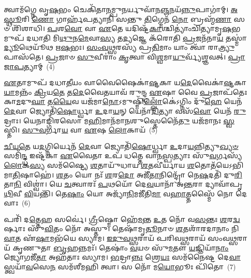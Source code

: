 {\anuvakamend[{\-\ul{𑌏}\-𑌨\-\ul{𑌮𑍇}\-𑌤𑌦\-\ul{𑌹𑍍𑌨𑍋}\-\-𑌽𑌷𑍍𑌟𑌾𑌚᳴𑌤𑍍𑌵𑌾𑌰𑌿𑍞𑌶𑌚𑍍𑌚}]}%

𑌤𑍍𑌵𑌾𑌮᳴𑌗𑍍𑌨𑍇 𑌵𑍃\-\ul{𑌷}\-𑌭𑌂 𑌚𑍇𑌕𑌿᳴𑌤𑌾\-\ul{𑌨}\-𑌮𑍍𑌪𑍁\-\ul{𑌨}\-𑌰𑍍𑌯𑍁𑌵𑌾᳴𑌨\-\ul{𑌞𑍍𑌜}\-𑌨𑌯᳴\-\ul{𑌨𑍍𑌨𑍁}\-𑌪𑌾𑌗𑌾॑𑌮𑍍। \ul{𑌅}\-\-\ul{𑌸𑍍𑌥𑍂}\-𑌰𑌿 \ul{𑌣𑍋} 𑌗𑌾𑌰𑍍\mbox{}𑌹᳴𑌪𑌤𑍍𑌯𑌾𑌨𑌿 𑌸𑌨𑍍𑌤𑍁 \ul{𑌤𑌿}\-𑌗𑍍𑌮𑍇𑌨᳴ \ul{𑌨𑍋} 𑌬𑍍𑌰𑌹𑍍𑌮᳴\-\ul{𑌣𑌾} 𑌸𑍞 𑌶𑌿᳴𑌶𑌾𑌧𑌿। \ul{𑌪}\-𑌶\-\ul{𑌵𑍋} 𑌵𑌾 \ul{𑌏}\-𑌤𑍇 𑌯𑌦𑌿𑌷𑍍𑌟᳴\-\ul{𑌕𑌾}\-𑌶𑍍𑌚𑌿𑌤𑍍𑌯𑌾𑌂॑𑌚𑌿𑌤𑍍𑌯𑌾𑌮𑍃\-\ul{𑌷}\-𑌭𑌮𑍁𑌪᳴ 𑌦𑌧𑌾𑌤𑌿 𑌮𑌿\-\ul{𑌥𑍁}\-𑌨\-\ul{𑌮𑍇}\-𑌵𑌾\-\ul{𑌸𑍍𑌯} 𑌤\-\ul{𑌦𑍍𑌯}\-𑌜𑍍𑌞𑍇 𑌕᳴𑌰𑍋𑌤𑌿 \ul{𑌪𑍍𑌰}\-𑌜𑌨᳴𑌨𑌾\-\ul{𑌯} 𑌤𑌸𑍍𑌮𑌾॑\-\ul{𑌦𑍍𑌯𑍂}\-𑌥𑍇𑌯𑍂᳴𑌥 𑌋\-\ul{𑌷}\-𑌭𑌃। \ul{𑌸𑌂}\-\-\ul{𑌵}\-\-\ul{𑌥𑍍𑌸}\-𑌰𑌸𑍍𑌯᳴ 𑌪𑍍𑌰\-\ul{𑌤𑌿}\-𑌮𑌾𑌂 𑌯𑌾𑌂 𑌤𑍍𑌵𑌾᳴ 𑌰𑌾\-\ul{𑌤𑍍𑌰𑍍𑌯𑍁}\-𑌪𑌾𑌸᳴𑌤𑍇। \ul{𑌪𑍍𑌰}\-𑌜𑌾𑍞 \ul{𑌸𑍁}\-𑌵𑍀𑌰𑌾𑌂॑ \ul{𑌕𑍃}\-𑌤𑍍𑌵𑌾 𑌵𑌿\-\ul{𑌶𑍍𑌵}\-𑌮𑌾\-\ul{𑌯𑍁}\-𑌰𑍍𑌵𑍍𑌯᳴𑌶𑍍𑌞𑌵𑌤𑍍। \ul{𑌪𑍍𑌰𑌾}\-\-\ul{𑌜𑌾}\-\-\ul{𑌪}\-𑌤𑍍𑌯𑌾𑌮𑍍~(4)

\-\ul{𑌏}\-𑌤𑌾𑌮𑍁𑌪᳴ 𑌦𑌧𑌾\-\ul{𑌤𑍀}\-𑌯𑌂 𑌵𑌾𑌵𑍈𑌷𑍈𑌕𑌾॑\-\ul{𑌷𑍍𑌟}\-𑌕𑌾 𑌯\-\ul{𑌦𑍇}\-𑌵𑍈𑌕𑌾॑\-\ul{𑌷𑍍𑌟}\-𑌕𑌾\-\ul{𑌯𑌾}\-𑌮𑌨𑍍𑌨𑌂᳴ \ul{𑌕𑍍𑌰𑌿}\-𑌯\-\ul{𑌤𑍇} 𑌤\-\ul{𑌦𑍇}\-𑌵𑍈𑌤𑌯𑌾𑌵᳴ 𑌰𑍁𑌨𑍍𑌦𑍍𑌧 \ul{𑌏}\-𑌷𑌾 𑌵𑍈 \ul{𑌪𑍍𑌰}\-𑌜𑌾𑌪᳴𑌤𑍇𑌃 𑌕𑌾\-\ul{𑌮}\-𑌦𑍁\-\ul{𑌘𑌾} 𑌤\-\ul{𑌯𑍈}\-𑌵 𑌯𑌜᳴𑌮𑌾\-\ul{𑌨𑍋}\-\-𑌽𑌮𑍁𑌷𑍍𑌮𑌿᳴\-\ul{𑌲𑍍𑌲𑍋𑌁}\-𑌕𑍇॑\-𑌽𑌗𑍍𑌨𑌿𑌂 𑌦𑍁᳴\-\ul{𑌹𑍇} 𑌯𑍇𑌨᳴ \ul{𑌦𑍇}\-𑌵𑌾 𑌜𑍍𑌯𑍋𑌤𑌿᳴\-\ul{𑌷𑍋}\-𑌰𑍍𑌧𑍍𑌵𑌾 \ul{𑌉}\-𑌦𑌾\-\ul{𑌯}\-𑌨𑍍 𑌯𑍇𑌨𑌾᳴\-\ul{𑌦𑌿}\-𑌤𑍍𑌯𑌾 𑌵𑌸᳴\-\ul{𑌵𑍋} 𑌯𑍇𑌨᳴ \ul{𑌰𑍁}\-𑌦𑍍𑌰𑌾𑌃। 𑌯𑍇𑌨𑌾𑌙𑍍𑌗𑌿᳴𑌰𑌸𑍋 𑌮\-\ul{𑌹𑌿}\-𑌮𑌾𑌨᳴𑌮𑌾\-\ul{𑌨}\-𑌶𑍁𑌸𑍍𑌤𑍇𑌨𑍈᳴\-\ul{𑌤𑍁} 𑌯𑌜᳴𑌮𑌾𑌨𑌃 \ul{𑌸𑍍𑌵}\-𑌸𑍍𑌤𑌿। \ul{𑌸𑍁}\-\-\ul{𑌵}\-𑌰𑍍𑌗𑌾\-\ul{𑌯} 𑌵𑌾 \ul{𑌏}\-𑌷 \ul{𑌲𑍋}\-𑌕𑌾𑌯᳴~(5)

\-\ul{𑌚𑍀}\-\-\ul{𑌯}\-\-\ul{𑌤𑍇} 𑌯\-\ul{𑌦}\-𑌗𑍍𑌨𑌿𑌰𑍍𑌯𑍇𑌨᳴ \ul{𑌦𑍇}\-𑌵𑌾 𑌜𑍍𑌯𑍋𑌤𑌿᳴\-\ul{𑌷𑍋}\-𑌰𑍍𑌧𑍍𑌵𑌾 \ul{𑌉}\-𑌦𑌾\-\ul{𑌯}\-𑌨𑍍𑌨𑌿𑌤𑍍𑌯𑍁\-\ul{𑌖𑍍𑌯}\-\-\ul{𑍞} 𑌸𑌮𑌿᳴\-\ul{𑌨𑍍𑌦𑍍𑌧} 𑌇𑌷𑍍𑌟᳴𑌕𑌾 \ul{𑌏}\-𑌵𑍈𑌤𑌾 𑌉𑌪᳴ 𑌧𑌤𑍍𑌤𑍇 𑌵𑌾𑌨\-\ul{𑌸𑍍𑌪}\-𑌤𑍍𑌯𑌾𑌃 𑌸𑍁᳴\-\ul{𑌵}\-𑌰𑍍𑌗𑌸𑍍𑌯᳴ \ul{𑌲𑍋}\-𑌕\-\ul{𑌸𑍍𑌯} 𑌸𑌮᳴𑌷𑍍𑌟𑍍𑌯𑍈 \ul{𑌶}\-𑌤𑌾𑌯𑍁᳴𑌧𑌾𑌯 \ul{𑌶}\-𑌤𑌵𑍀॑𑌰𑍍𑌯𑌾𑌯 \ul{𑌶}\-𑌤𑍋𑌤᳴𑌯𑍇\-𑌽𑌭𑌿𑌮𑌾\-\ul{𑌤𑌿}\-𑌷𑌾𑌹𑍇॑। \ul{𑌶}\-𑌤𑌂 𑌯𑍋 𑌨𑌃᳴ \ul{𑌶}\-𑌰\-\ul{𑌦𑍋} 𑌅𑌜𑍀᳴\-\ul{𑌤𑌾}\-𑌨𑌿𑌨𑍍𑌦𑍍𑌰𑍋᳴ 𑌨𑍇\-\ul{𑌷}\-𑌦𑌤𑌿᳴ 𑌦𑍁\-\ul{𑌰𑌿}\-𑌤𑌾\-\ul{𑌨𑌿} 𑌵𑌿𑌶𑍍𑌵𑌾॑। 𑌯𑍇 \ul{𑌚}\-𑌤𑍍𑌵𑌾𑌰𑌃᳴ \ul{𑌪}\-𑌥𑌯𑍋᳴ 𑌦𑍇\-\ul{𑌵}\-𑌯𑌾𑌨𑌾᳴ 𑌅\-\ul{𑌨𑍍𑌤}\-𑌰𑌾 𑌦𑍍𑌯𑌾𑌵𑌾᳴𑌪𑍃\-\ul{𑌥𑌿}\-𑌵𑍀 \ul{𑌵𑌿}\-𑌯𑌨𑍍𑌤𑌿᳴। 𑌤𑍇\-\ul{𑌷𑌾𑌂} 𑌯𑍋 𑌅𑌜𑍍𑌯𑌾᳴\-\ul{𑌨𑌿}\-𑌮𑌜𑍀᳴𑌤𑌿\-\ul{𑌮𑌾} 𑌵\-\ul{𑌹𑌾}\-𑌤𑍍𑌤𑌸𑍍𑌮𑍈᳴ 𑌨𑍋 𑌦𑍇𑌵𑌾𑌃~(6)

𑌪𑌰𑌿᳴ 𑌦\-\ul{𑌤𑍍𑌤𑍇}\-𑌹 𑌸𑌰𑍍𑌵𑍇॑। \ul{𑌗𑍍𑌰𑍀}\-𑌷𑍍𑌮𑍋 𑌹𑍇᳴\-\ul{𑌮}\-𑌨𑍍𑌤 \ul{𑌉}\-𑌤 𑌨𑍋᳴ 𑌵\-\ul{𑌸}\-𑌨𑍍𑌤𑌃 \ul{𑌶}\-𑌰\-\ul{𑌦𑍍𑌵}\-𑌰𑍍\mbox{}𑌷𑌾𑌃 𑌸𑍁᳴\-\ul{𑌵𑌿}\-𑌤𑌂 𑌨𑍋᳴ 𑌅𑌸𑍍𑌤𑍁। 𑌤𑍇𑌷𑌾᳴𑌮𑍃\-\ul{𑌤𑍂}\-𑌨𑌾𑍞 \ul{𑌶}\-𑌤𑌶𑌾᳴𑌰𑌦𑌾𑌨𑌾𑌂 𑌨𑌿\-\ul{𑌵𑌾}\-𑌤 𑌏᳴\-\ul{𑌷𑌾}\-𑌮𑌭᳴𑌯𑍇 𑌸𑍍𑌯𑌾𑌮। \ul{𑌇}\-\-\ul{𑌦𑍁}\-\-\ul{𑌵}\-\-\ul{𑌥𑍍𑌸}\-𑌰𑌾𑌯᳴ 𑌪𑌰𑌿𑌵\-\ul{𑌥𑍍𑌸}\-𑌰𑌾𑌯᳴ 𑌸𑌂𑌵\-\ul{𑌥𑍍𑌸}\-𑌰𑌾𑌯᳴ 𑌕𑍃𑌣𑍁𑌤𑌾 \ul{𑌬𑍃}\-𑌹𑌨𑍍𑌨𑌮𑌃᳴। 𑌤𑍇𑌷𑌾𑌂॑ \ul{𑌵}\-𑌯𑍞 𑌸𑍁᳴\-\ul{𑌮}\-𑌤𑍗 \ul{𑌯}\-𑌜𑍍𑌞𑌿𑌯𑌾᳴\-\ul{𑌨𑌾𑌂} 𑌜𑍍𑌯𑍋𑌗𑌜𑍀᳴\-\ul{𑌤𑌾} 𑌅𑌹᳴𑌤𑌾𑌃 𑌸𑍍𑌯𑌾𑌮। \ul{𑌭}\-𑌦𑍍𑌰𑌾\-\ul{𑌨𑍍𑌨𑌃} 𑌶𑍍𑌰𑍇\-\ul{𑌯𑌃} 𑌸𑌮᳴𑌨𑍈𑌷𑍍𑌟 𑌦𑍇\-\ul{𑌵𑌾}\-𑌸𑍍𑌤𑍍𑌵𑌯𑌾᳴\-\ul{𑌵}\-𑌸𑍇\-\ul{𑌨} 𑌸𑌮᳴𑌶𑍀𑌮𑌹𑌿 𑌤𑍍𑌵𑌾। 𑌸 𑌨𑍋᳴ 𑌮\-\ul{𑌯𑍋}\-𑌭𑍂𑌃 𑌪𑌿᳴𑌤𑍋~(7)


